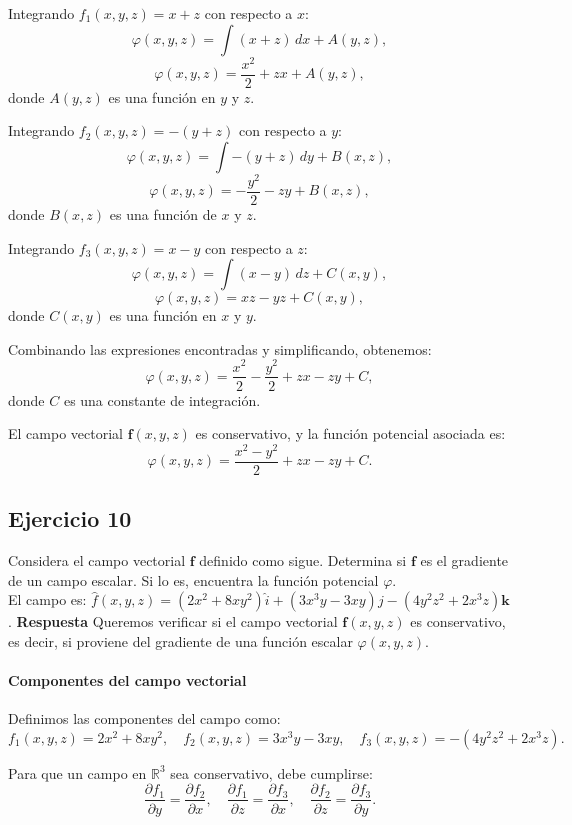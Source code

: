 \documentclass{report}
\begin{document}
Integrando \( f_1(x, y, z) = x + z \) con respecto a \( x \):
\[
\varphi(x, y, z) = \int (x + z) \, dx + A(y, z),
\]
\[
\varphi(x, y, z) = \frac{x^2}{2} + z x + A(y, z),
\]
donde \( A(y, z) \) es una función en \( y \) y \( z \).



Integrando \( f_2(x, y, z) = -(y + z) \) con respecto a \( y \):
\[
\varphi(x, y, z) = \int -(y + z) \, dy + B(x, z),
\]
\[
\varphi(x, y, z) = -\frac{y^2}{2} - z y + B(x, z),
\]
donde \( B(x, z) \) es una función de \( x \) y \( z \).



Integrando \( f_3(x, y, z) = x - y \) con respecto a \( z \):
\[
\varphi(x, y, z) = \int (x - y) \, dz + C(x, y),
\]
\[
\varphi(x, y, z) = x z - y z + C(x, y),
\]
donde \( C(x, y) \) es una función en \( x \) y \( y \).



Combinando las expresiones encontradas y simplificando, obtenemos:
\[
\varphi(x, y, z) = \frac{x^2}{2} - \frac{y^2}{2} + z x - z y + C,
\]
donde \( C \) es una constante de integración.



El campo vectorial \( \mathbf{f}(x, y, z) \) es conservativo, y la función potencial asociada es:
\[
{\varphi(x, y, z) = \frac{x^2 - y^2}{2} + z x - z y + C}.
\]

\subsection*{Ejercicio 10}
Considera el campo vectorial $\boldsymbol{f}$ definido como sigue. Determina si $\boldsymbol{f}$ es el gradiente de un campo escalar. Si lo es, encuentra la función potencial $\varphi$.\\
El campo es: $\hat{f}(x, y, z)=\left(2 x^2+8 x y^2\right) \hat{i}+\left(3 x^3 y-3 x y\right) j-\left(4 y^2 z^2+2 x^3 z\right) \boldsymbol{k}$.
\textbf{Respuesta}
Queremos verificar si el campo vectorial \( \mathbf{f}(x, y, z) \) es conservativo, es decir, si proviene del gradiente de una función escalar \( \varphi(x, y, z) \).

\paragraph{Componentes del campo vectorial}
Definimos las componentes del campo como:
\[
f_1(x, y, z) = 2x^2 + 8xy^2, \quad
f_2(x, y, z) = 3x^3y - 3xy, \quad
f_3(x, y, z) = -\left(4y^2z^2 + 2x^3z\right).
\]

Para que un campo en \(\mathbb{R}^3\) sea conservativo, debe cumplirse:
\[
\frac{\partial f_1}{\partial y} = \frac{\partial f_2}{\partial x}, \quad
\frac{\partial f_1}{\partial z} = \frac{\partial f_3}{\partial x}, \quad
\frac{\partial f_2}{\partial z} = \frac{\partial f_3}{\partial y}.
\]
\end{document}
